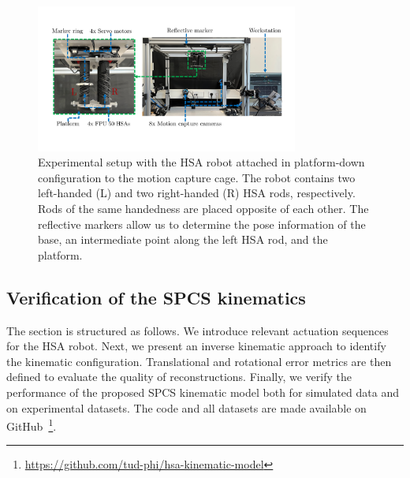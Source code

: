 
\begin{figure}
    \centering
    \includegraphics[width=0.77\textwidth]{hsamodel/figures/experimental_setup/experimental_setup_v3_compressed.pdf}
    \caption{Experimental setup with the \gls{HSA} robot attached in platform-down configuration to the motion capture cage. The robot contains two left-handed (L) and two right-handed (R) \gls{HSA} rods, respectively. Rods of the same handedness are placed opposite of each other. The reflective markers allow us to determine the pose information of the base, an intermediate point along the left \gls{HSA} rod, and the platform.}\label{fig:hsamodel:experimental_setup}
\end{figure}



\subsection{Verification of the SPCS kinematics}\label{sub:hsamodel:hsa_rod_kinematics:verification}
The section is structured as follows. We introduce relevant actuation sequences for the \gls{HSA} robot.
Next, we present an inverse kinematic approach to identify the kinematic configuration.
Translational and rotational error metrics are then defined to evaluate the quality of reconstructions. %
Finally, we verify the performance of the proposed \gls{SPCS} kinematic model both for simulated data and on experimental datasets.
The code and all datasets are made available on GitHub~\footnote{\scriptsize \url{https://github.com/tud-phi/hsa-kinematic-model}}.


